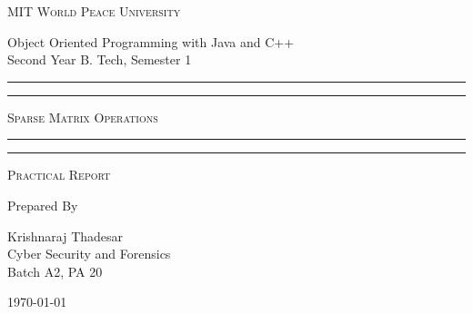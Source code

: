 \documentclass[11pt]{article}
\begin{document}
\begin{titlepage}
	\centering


	\huge\textsc{
		MIT World Peace University
	}\\

	\vspace{0.75\baselineskip} %

	\LARGE{
		Object Oriented Programming with Java and C++\\
		Second Year B. Tech, Semester 1
	}

	\vfill %


	\rule{\textwidth}{1.6pt}\vspace*{-\baselineskip}\vspace*{2pt}
	\rule{\textwidth}{0.6pt}
	\vspace{0.75\baselineskip} %



	\huge{\textsc{
			Sparse Matrix Operations
		}} \\



	\vspace{0.5\baselineskip} %
	\rule{\textwidth}{0.6pt}\vspace*{-\baselineskip}\vspace*{2.8pt}
	\rule{\textwidth}{1.6pt}

	\vspace{1\baselineskip} %


	\LARGE\textsc{
		Practical Report
	} %
	\vfill


	Prepared By
	\vspace{0.5\baselineskip} %

	\Large{
		Krishnaraj Thadesar \\
		Cyber Security and Forensics\\
		Batch A2, PA 20
	}


	\vspace{0.5\baselineskip} %
	\today

\end{titlepage}
\end{document}
